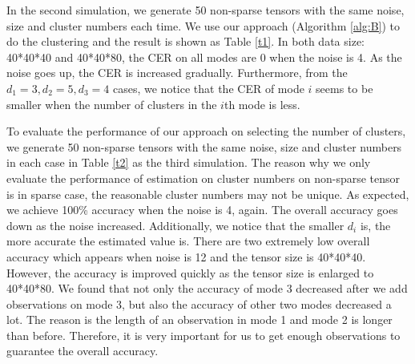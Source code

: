 \documentclass{article}
\begin{document}
In the second simulation, we generate 50 non-sparse tensors with the same noise, size and cluster numbers each time. We use our approach (Algorithm \ref{alg:B}) to do the clustering and the result is shown as Table \ref{t1}. In both data size: 40*40*40 and 40*40*80, the CER on all modes are 0 when the noise is 4. As the noise goes up, the CER is increased gradually. Furthermore, from the $d_1=3, d_2=5, d_3=4$ cases, we notice that the CER of mode $i$ seems to be smaller when the number of clusters in the $i$th mode is less. \par 

To evaluate the performance of our approach on selecting the number of clusters, we generate 50 non-sparse tensors with the same noise, size and cluster numbers in each case in Table \ref{t2} as the third simulation.  The reason why we only evaluate the performance of estimation on cluster numbers on non-sparse tensor is in sparse case, the reasonable cluster numbers may not be unique. As expected, we achieve 100\% accuracy when the noise is 4, again. The overall accuracy goes down as the noise increased. Additionally, we notice that the smaller $d_i$ is, the more accurate the estimated value is. There are two extremely low overall accuracy which appears when noise is 12 and the tensor size is 40*40*40. However, the accuracy is improved quickly as the tensor size is enlarged to 40*40*80. We found that not only the accuracy of mode 3 decreased after we add observations on mode 3, but also the accuracy of other two modes decreased a lot. The reason is the length of an observation in mode 1 and mode 2 is longer than before. Therefore, it is very important for us to get enough observations to guarantee the overall accuracy.\par
\end{document}
